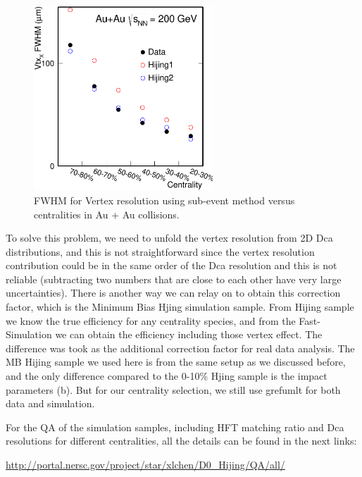 \begin{figure}
\centering
\includegraphics[width=0.6\textwidth]{figure/Run14_D0HFT/vtxX_vsCent_pwg.eps}
\caption{ FWHM for Vertex resolution using sub-event method versus centralities in Au + Au collisions.}
\label{vtxX_vsCent} 
\end{figure}

To solve this problem, we need to unfold the vertex resolution from 2D Dca distributions, and this is not straightforward since the vertex resolution contribution could be in the same order of the Dca resolution and this is not reliable (subtracting two numbers that are close to each other have very large uncertainties). There is another way we can relay on to obtain this correction factor, which is the Minimum Bias Hjing simulation sample. From Hijing sample we know the true efficiency for any centrality species, and from the Fast-Simulation we can obtain the efficiency including those vertex effect. The difference was took as the additional correction factor for real data analysis. The MB Hijing sample we used here is from the same setup as we discussed before, and the only difference compared to the 0-10\% Hjing sample is the impact parameters (b). But for our centrality selection, we still use grefumlt for both data and simulation.

For the QA of the simulation samples, including HFT matching ratio and Dca resolutions for different centralities, all the details can be found in the next links:

\url{http://portal.nersc.gov/project/star/xlchen/D0_Hijing/QA/all/}

